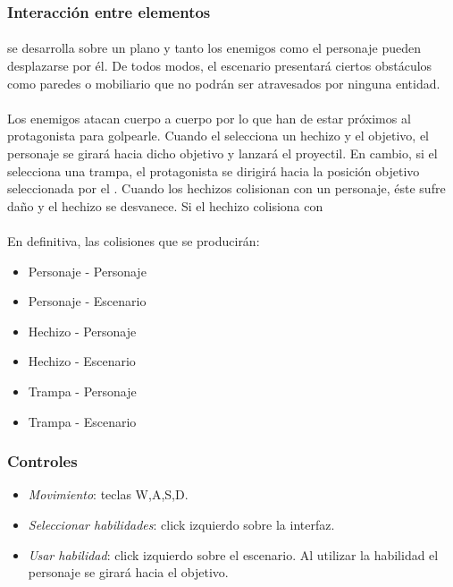 \subsubsection{Interacción entre elementos}

\paragraph{}
\juego se desarrolla sobre un plano y tanto los enemigos como el personaje
pueden desplazarse por él. De todos modos, el escenario presentará ciertos
obstáculos como paredes o mobiliario que no podrán ser atravesados por
ninguna entidad.

\paragraph{}
Los enemigos atacan cuerpo a cuerpo por lo que han de estar próximos al protagonista
para golpearle. Cuando el \jugador selecciona un hechizo y el objetivo, el 
personaje se girará hacia dicho objetivo y lanzará el proyectil. En cambio,
si el \jugador selecciona una trampa, el protagonista se dirigirá hacia la
posición objetivo seleccionada por el \jugador. Cuando los hechizos colisionan
con un personaje, éste sufre daño y el hechizo se desvanece. Si el hechizo
colisiona con 

\paragraph{}
En definitiva, las colisiones que se producirán:

\begin{itemize}
    \item Personaje - Personaje
    \item Personaje - Escenario
    \item Hechizo - Personaje
    \item Hechizo - Escenario
    \item Trampa - Personaje
    \item Trampa - Escenario
\end{itemize}

\subsubsection{Controles}

\begin{itemize}
    \item \emph{Movimiento}: teclas W,A,S,D.
    \item \emph{Seleccionar habilidades}: click izquierdo sobre la interfaz.
    \item \emph{Usar habilidad}: click izquierdo sobre el escenario. Al utilizar
    la habilidad el personaje se girará hacia el objetivo.
\end{itemize}
